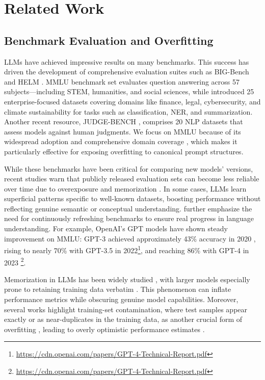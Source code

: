 \section{Related Work}
\label{sec:related_work}
\subsection{Benchmark Evaluation and Overfitting}

LLMs have achieved impressive results on many benchmarks. This success has driven the development of comprehensive evaluation suites such as BIG-Bench \cite{srivastava2022beyond} and HELM \cite{liang2022holistic}. MMLU benchmark set \cite{hendrycks2020measuring} evaluates question answering across 57 subjects—including STEM, humanities, and social sciences, while \cite{bing_zhang__2024} introduced 25 enterprise-focused datasets covering domains like finance, legal, cybersecurity, and climate sustainability for tasks such as classification, NER, and summarization. Another recent resource, JUDGE-BENCH \cite{anna_bavaresco__2024}, comprises 20 NLP datasets that assess models against human judgments. We focus on MMLU because of its widespread adoption and comprehensive domain coverage \cite{wang2024mmlu}, which makes it particularly effective for exposing overfitting to canonical prompt structures.


While these benchmarks have been critical for comparing new models' versions, recent studies warn that publicly released evaluation sets can become less reliable over time due to overexposure and memorization \cite{yuan_yu__2024, chang2024survey}. In some cases, LLMs learn superficial patterns specific to well-known datasets, boosting performance without reflecting genuine semantic or conceptual understanding. \cite{kiela2021dynabench} further emphasize the need for continuously refreshing benchmarks to ensure real progress in language understanding. For example, OpenAI's GPT models have shown steady improvement on MMLU: GPT-3 achieved approximately 43\% accuracy in 2020 \cite{brown2020language}, rising to nearly 70\% with GPT-3.5 in 2022\footnote{\url{https://cdn.openai.com/papers/GPT-4-Technical-Report.pdf}}, and reaching 86\% with GPT-4 in 2023 \footnote{\url{https://cdn.openai.com/papers/GPT-4-Technical-Report.pdf}}. 

Memorization in LLMs has been widely studied \cite{kiyomaru2024comprehensive, biderman2024emergent}, with larger models especially prone to retaining training data verbatim \cite{carlini2022quantifying}. This phenomenon can inflate performance metrics while obscuring genuine model capabilities. Moreover, several works highlight training-set contamination, where test samples appear exactly or as near-duplicates in the training data, as another crucial form of overfitting \cite{deng2023investigating, yao2024data}, leading to overly optimistic performance estimates \cite{yang2023rethinking}.


